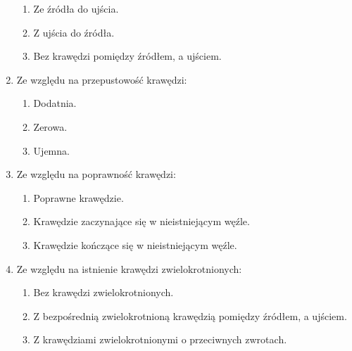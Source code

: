 \begin{enumerate}
\begin{enumerate}
            \item Ze źródła do ujścia.
            \item Z ujścia do źródła.
            \item Bez krawędzi pomiędzy źródłem, a ujściem.
        \end{enumerate}
    \item Ze względu na przepustowość krawędzi:
        \begin{enumerate}
            \item Dodatnia.
            \item Zerowa.
            \item Ujemna.
        \end{enumerate}
    \item Ze względu na poprawność krawędzi:
        \begin{enumerate}
            \item Poprawne krawędzie.
            \item Krawędzie zaczynające się w nieistniejącym węźle.
            \item Krawędzie kończące się w nieistniejącym węźle.
        \end{enumerate}
    \item Ze względu na istnienie krawędzi zwielokrotnionych:
        \begin{enumerate}
            \item Bez krawędzi zwielokrotnionych.
            \item Z bezpośrednią zwielokrotnioną krawędzią pomiędzy źródłem, a ujściem.
            \item Z krawędziami zwielokrotnionymi o przeciwnych zwrotach.
        \end{enumerate}
\end{enumerate}
